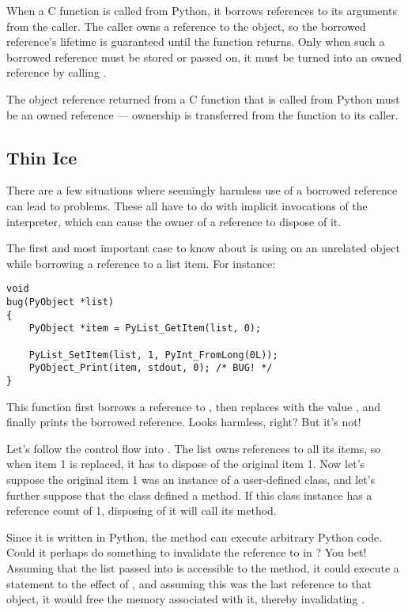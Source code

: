 When a C function is called from Python, it borrows references to its
arguments from the caller.  The caller owns a reference to the object,
so the borrowed reference's lifetime is guaranteed until the function
returns.  Only when such a borrowed reference must be stored or passed
on, it must be turned into an owned reference by calling
.

The object reference returned from a C function that is called from
Python must be an owned reference --- ownership is transferred from
the function to its caller.


\subsection{Thin Ice
            \label{thinIce}}

There are a few situations where seemingly harmless use of a borrowed
reference can lead to problems.  These all have to do with implicit
invocations of the interpreter, which can cause the owner of a
reference to dispose of it.

The first and most important case to know about is using
 on an unrelated object while borrowing a
reference to a list item.  For instance:

\begin{verbatim}
void
bug(PyObject *list)
{
    PyObject *item = PyList_GetItem(list, 0);

    PyList_SetItem(list, 1, PyInt_FromLong(0L));
    PyObject_Print(item, stdout, 0); /* BUG! */
}
\end{verbatim}

This function first borrows a reference to , then
replaces  with the value , and finally prints
the borrowed reference.  Looks harmless, right?  But it's not!

Let's follow the control flow into .  The list
owns references to all its items, so when item 1 is replaced, it has
to dispose of the original item 1.  Now let's suppose the original
item 1 was an instance of a user-defined class, and let's further
suppose that the class defined a  method.  If this
class instance has a reference count of 1, disposing of it will call
its  method.

Since it is written in Python, the  method can execute
arbitrary Python code.  Could it perhaps do something to invalidate
the reference to  in ?  You bet!  Assuming
that the list passed into  is accessible to the
 method, it could execute a statement to the effect of
, and assuming this was the last reference to that
object, it would free the memory associated with it, thereby
invalidating .

